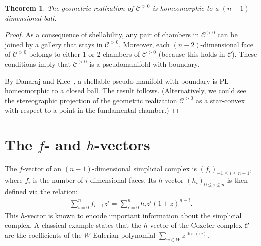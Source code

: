\documentclass[11pt]{article}
\newtheorem{theo}{Theorem}[section]
\theoremstyle{definition}
\DeclareMathOperator{\Span}{Span}
\newcommand{\CC}{\mathcal{C}}
\newcommand{\CCP}{\mathcal{C}^{>0}}
\begin{document}
\begin{theo} \label{theo:ball}
    The geometric realization of $\CCP$ is homeomorphic to a $(n-1)$-dimensional ball. 
\end{theo}

\begin{proof}
    As a consequence of shellability, any pair of chambers in $\CCP$ can be joined by a gallery that stays in $\CCP$.  Moreover, each $(n-2)$-dimensional face of $\CCP$ belongs to either 1 or 2 chambers of $\CCP$ (because this holds in $\CC$).  These conditions imply that $\CCP$ is a pseudomanifold with boundary.

    By Danaraj and Klee~\cite{danarajklee}, a shellable pseudo-manifold with boundary is PL-homeomorphic to a closed ball.  The result follows.  (Alternatively, we could see the stereographic projection of the geometric realization $\CCP$ as a star-convex with respect to a point in the fundamental chamber.)
\end{proof}


\section{\texorpdfstring{The $f$- and $h$-vectors}{The f- and h-vectors}}
\label{sec:vectors}

The $f$-vector of an $(n-1)$-dimensional simplicial complex is $(f_i)_{-1\leq i \leq n-1}$, where $f_i$ is the number of $i$-dimensional faces.  Its $h$-vector $(h_i)_{0\leq i \leq n}$ is then defined via the relation:
\begin{align} \label{eq:rel_fh}
    \sum_{i=0}^n f_{i-1} z^i
        =
    \sum_{i=0}^n h_i z^i(1+z)^{n-i}.
\end{align}
This $h$-vector is known to encode important information about the simplicial complex. A classical example states that the $h$-vector of the Coxeter complex $\CC$ are the coefficients of the $W$-Eulerian polynomial $\sum_{w\in W} z^{\operatorname{des}(w)}$.
\end{document}
